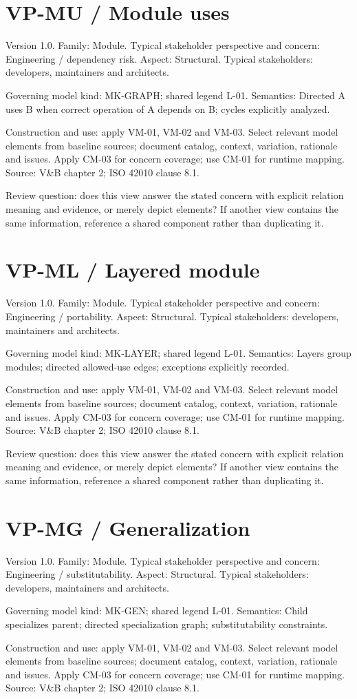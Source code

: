 \documentclass[11pt,letterpaper]{article}
\newcommand{\docsection}[1]{\Needspace{5\baselineskip}\section{#1}}
\begin{document}
\docsection{VP-MU / Module uses}
Version 1.0. Family: Module. Typical stakeholder perspective and concern: Engineering / dependency risk. Aspect: Structural. Typical stakeholders: developers, maintainers and architects.

Governing model kind: MK-GRAPH; shared legend L-01. Semantics: Directed A uses B when correct operation of A depends on B; cycles explicitly analyzed.

Construction and use: apply VM-01, VM-02 and VM-03. Select relevant model elements from baseline sources; document catalog, context, variation, rationale and issues. Apply CM-03 for concern coverage; use CM-01 for runtime mapping. Source: V\&B chapter 2; ISO 42010 clause 8.1.

Review question: does this view answer the stated concern with explicit relation meaning and evidence, or merely depict elements? If another view contains the same information, reference a shared component rather than duplicating it.

\docsection{VP-ML / Layered module}
Version 1.0. Family: Module. Typical stakeholder perspective and concern: Engineering / portability. Aspect: Structural. Typical stakeholders: developers, maintainers and architects.

Governing model kind: MK-LAYER; shared legend L-01. Semantics: Layers group modules; directed allowed-use edges; exceptions explicitly recorded.

Construction and use: apply VM-01, VM-02 and VM-03. Select relevant model elements from baseline sources; document catalog, context, variation, rationale and issues. Apply CM-03 for concern coverage; use CM-01 for runtime mapping. Source: V\&B chapter 2; ISO 42010 clause 8.1.

Review question: does this view answer the stated concern with explicit relation meaning and evidence, or merely depict elements? If another view contains the same information, reference a shared component rather than duplicating it.

\docsection{VP-MG / Generalization}
Version 1.0. Family: Module. Typical stakeholder perspective and concern: Engineering / substitutability. Aspect: Structural. Typical stakeholders: developers, maintainers and architects.

Governing model kind: MK-GEN; shared legend L-01. Semantics: Child specializes parent; directed specialization graph; substitutability constraints.

Construction and use: apply VM-01, VM-02 and VM-03. Select relevant model elements from baseline sources; document catalog, context, variation, rationale and issues. Apply CM-03 for concern coverage; use CM-01 for runtime mapping. Source: V\&B chapter 2; ISO 42010 clause 8.1.
\end{document}
